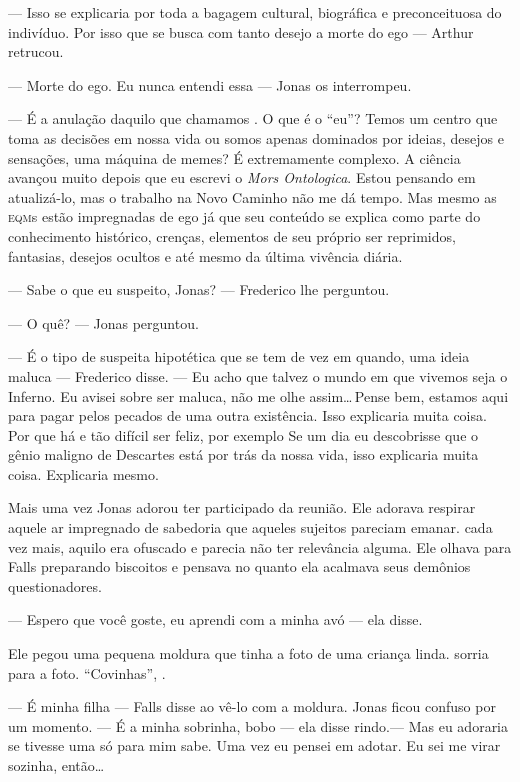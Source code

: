 --- Isso se explicaria por toda a bagagem cultural, biográfica e preconceituosa do indivíduo. Por isso que se busca com tanto desejo a morte do ego --- Arthur retrucou.

--- Morte do ego. Eu nunca entendi essa --- Jonas os interrompeu.

--- É a anulação daquilo que chamamos . O que é o ``eu''? Temos um centro que toma as decisões em nossa vida ou somos apenas dominados por ideias, desejos e sensações, uma máquina de memes? É extremamente complexo. A ciência avançou muito depois que eu escrevi o \emph{Mors Ontologica}. Estou pensando em atualizá-lo, mas o trabalho na Novo Caminho não me dá tempo. Mas mesmo as \textsc{eqm}s estão impregnadas de ego\mudanca{,} já que seu conteúdo se explica como parte do conhecimento histórico, crenças, elementos de seu próprio ser reprimidos, fantasias, desejos ocultos e até mesmo da última vivência diária.

--- Sabe o que eu suspeito, Jonas? --- Frederico lhe perguntou.

--- O quê? --- Jonas perguntou.

--- É o tipo de suspeita hipotética que se tem de vez em quando, uma ideia maluca --- Frederico disse. --- Eu acho que talvez o mundo em que vivemos seja o Inferno. Eu avisei sobre ser maluca, não me olhe assim\ldots\,Pense bem, estamos aqui para pagar pelos pecados de uma outra existência. Isso explicaria muita coisa. Por que há  e  tão difícil ser feliz, por exemplo Se um dia eu descobrisse que o gênio maligno de Descartes está por trás da nossa vida, isso explicaria muita coisa. Explicaria mesmo.

Mais uma vez Jonas adorou ter participado da reunião. Ele adorava respirar aquele ar impregnado de sabedoria que aqueles sujeitos pareciam emanar.  cada vez mais, aquilo era ofuscado e parecia não ter relevância alguma. Ele olhava para Falls preparando biscoitos e pensava no quanto ela acalmava seus demônios questionadores.

--- Espero que você goste, eu aprendi com a minha avó --- ela disse.

Ele pegou uma pequena moldura que tinha a foto de uma criança linda.  sorria para a foto. ``Covinhas'', .

--- É minha filha --- Falls disse\mudanca{,} ao vê-lo com a moldura. Jonas ficou confuso por um momento. --- É a minha sobrinha, bobo --- ela disse rindo.--- Mas eu adoraria se tivesse uma só para mim\mudanca{,} sabe. Uma vez eu pensei em adotar. Eu sei me virar sozinha, então\ldots


